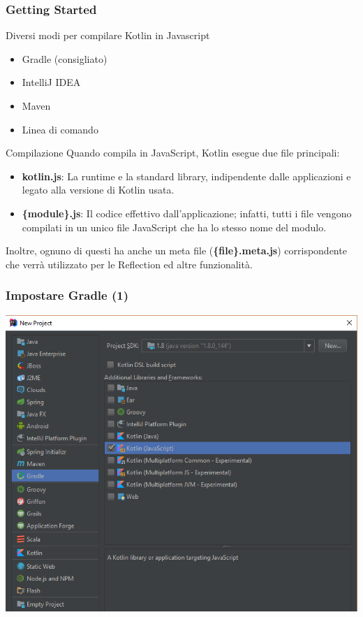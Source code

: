     \begin{frame}
      \frametitle{Getting Started}
      \begin{block}{Diversi modi per compilare Kotlin in Javascript}
        \begin{itemize}
          \item \alert{Gradle} (consigliato)
          \item IntelliJ IDEA
          \item Maven
          \item Linea di comando
        \end{itemize}
      \end{block}
      \begin{block}{Compilazione}
        Quando compila in JavaScript, Kotlin esegue due file principali:
        \begin{itemize}
          \item \textbf{kotlin.js}: La runtime e la standard library, indipendente dalle applicazioni e legato
          alla versione di Kotlin usata.
          \item \textbf{\{module\}.js}: Il codice effettivo dall'applicazione; infatti, tutti i file vengono compilati
          in un unico file JavaScript che ha lo stesso nome del modulo.
        \end{itemize}
        Inoltre, ognuno di questi ha anche un meta file (\textbf{\{file\}.meta.js}) corrispondente che verrà
        utilizzato per le Reflection ed altre funzionalità.
      \end{block}
    \end{frame}

    \begin{frame}
      \frametitle{Impostare Gradle (1)}
      \begin{center}
      \includegraphics[scale=0.5]{NewProject}
      \end{center}
    \end{frame}

